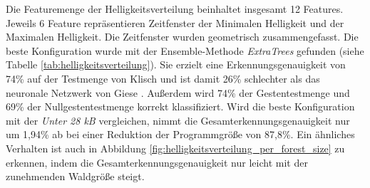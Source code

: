 Die Featuremenge der Helligkeitsverteilung beinhaltet insgesamt 12 Features. Jeweils 6 Feature repräsentieren Zeitfenster der Minimalen Helligkeit und der Maximalen Helligkeit. Die Zeitfenster wurden
geometrisch zusammengefasst.
\newline
\newline
Die beste Konfiguration wurde mit der Ensemble-Methode \textit{ExtraTrees} gefunden (siehe Tabelle \ref{tab:helligkeitsverteilung}). Sie erzielt eine Erkennungsgenauigkeit von 74\% auf der Testmenge von Klisch
und ist damit 26\% schlechter als das neuronale Netzwerk von Giese \cite{gieseThesis}. Außerdem wird 74\% der Gestentestmenge und 69\% der Nullgestentestmenge korrekt klassifiziert.
\newline
\newline
Wird die beste Konfiguration mit der \textit{Unter 28 kB} vergleichen, nimmt die Gesamterkennungsgenauigkeit nur um 1,94\% ab bei einer Reduktion der Programmgröße von 87,8\%.
Ein ähnliches Verhalten ist auch in Abbildung \ref{fig:helligkeitsverteilung_per_forest_size} zu erkennen, indem die Gesamterkennungsgenauigkeit nur leicht mit der zunehmenden Waldgröße steigt.